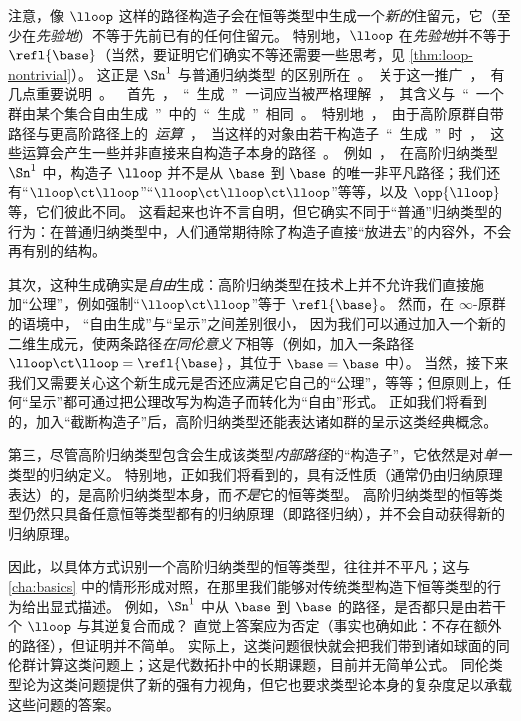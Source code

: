 注意，像 $\lloop$ 这样的路径构造子会在恒等类型中生成一个\emph{新的}住留元，它（至少在\emph{先验地}）不等于先前已有的任何住留元。
特别地，$\lloop$ 在\emph{先验地}并不等于 $\refl{\base}$（当然，要证明它们确实不等还需要一些思考，见 \cref{thm:loop-nontrivial}）。
这正是 $\Sn^1$ 与普通归纳类型 \unit 的区别所在。

关于这一推广，有几点重要说明。

%
首先，“生成”一词应当被严格理解，其含义与“一个群由某个集合自由生成”中的“生成”相同。
特别地，由于高阶原群自带路径与更高阶路径上的\emph{运算}，当这样的对象由若干构造子“生成”时，这些运算会产生一些并非直接来自构造子本身的路径。
例如，在高阶归纳类型 $\Sn^1$ 中，构造子 $\lloop$ 并不是从 $\base$ 到 $\base$ 的唯一非平凡路径；我们还有“$\lloop\ct\lloop$”“$\lloop\ct\lloop\ct\lloop$”等等，以及 $\opp{\lloop}$ 等，它们彼此不同。
这看起来也许不言自明，但它确实不同于“普通”归纳类型的行为：在普通归纳类型中，人们通常期待除了构造子直接“放进去”的内容外，不会再有别的结构。

其次，这种生成确实是\emph{自由}生成：高阶归纳类型在技术上并不允许我们直接施加“公理”，例如强制“$\lloop\ct\lloop$”等于 $\refl{\base}$。
然而，在 $\infty$-原群的语境中，%
“自由生成”与“呈示”之间差别很小，
%
%
因为我们可以通过加入一个新的二维生成元，使两条路径\emph{在同伦意义下}相等（例如，加入一条路径 $\lloop\ct\lloop = \refl{\base}$，其位于 $\base=\base$ 中）。
当然，接下来我们又需要关心这个新生成元是否还应满足它自己的“公理”，等等；但原则上，任何“呈示”都可通过把公理改写为构造子而转化为“自由”形式。
正如我们将看到的，加入“截断构造子”后，高阶归纳类型还能表达诸如群的呈示这类经典概念。

第三，尽管高阶归纳类型包含会生成该类型\emph{内部路径}的“构造子”，它依然是对\emph{单一}类型的归纳定义。
特别地，正如我们将看到的，具有泛性质（通常仍由归纳原理表达）的，是高阶归纳类型本身，而\emph{不是}它的恒等类型。
高阶归纳类型的恒等类型仍然只具备任意恒等类型都有的归纳原理（即路径归纳），并不会自动获得新的归纳原理。

因此，以具体方式识别一个高阶归纳类型的恒等类型，往往并不平凡；这与 \cref{cha:basics} 中的情形形成对照，在那里我们能够对传统类型构造下恒等类型的行为给出显式描述。
例如，$\Sn^1$ 中从 $\base$ 到 $\base$ 的路径，是否都只是由若干个 $\lloop$ 与其逆复合而成？
直觉上答案应为否定（事实也确如此：不存在额外的路径），但证明并不简单。
实际上，这类问题很快就会把我们带到诸如球面的同伦群计算这类问题上；这是代数拓扑中的长期课题，目前并无简单公式。
同伦类型论为这类问题提供了新的强有力视角，但它也要求类型论本身的复杂度足以承载这些问题的答案。

